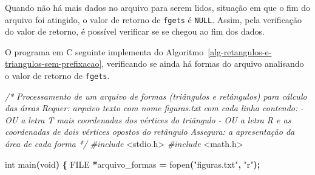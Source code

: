 \documentclass[
  11pt,
  a4paper,
]{scrbook}
\newenvironment{Shaded}{\begin{snugshade}}{\end{snugshade}}
\newcommand{\CommentTok}[1]{\textcolor[rgb]{0.56,0.35,0.01}{\textit{#1}}}
\newcommand{\DataTypeTok}[1]{\textcolor[rgb]{0.13,0.29,0.53}{#1}}
\newcommand{\ImportTok}[1]{#1}
\newcommand{\NormalTok}[1]{#1}
\newcommand{\OperatorTok}[1]{\textcolor[rgb]{0.81,0.36,0.00}{\textbf{#1}}}
\newcommand{\PreprocessorTok}[1]{\textcolor[rgb]{0.56,0.35,0.01}{\textit{#1}}}
\newcommand{\StringTok}[1]{\textcolor[rgb]{0.31,0.60,0.02}{#1}}
\begin{document}
Quando não há mais dados no arquivo para serem lidos, situação em que o
fim do arquivo foi atingido, o valor de retorno de \texttt{fgets} é
\texttt{NULL}. Assim, pela verificação do valor de retorno, é possível
verificar se se chegou ao fim dos dados.

O programa em C seguinte implementa do
Algoritmo~\ref{alg-retangulos-e-triangulos-sem-prefixacao}, verificando
se ainda há formas do arquivo analisando o valor de retorno de
\texttt{fgets}.

\begin{Shaded}
\begin{Highlighting}[]
\CommentTok{/*}
\CommentTok{Processamento de um arquivo de formas (triângulos e retângulos) para cálculo}
\CommentTok{    das áreas}
\CommentTok{Requer: arquivo texto com nome \textquotesingle{}figuras.txt\textquotesingle{} com cada linha contendo:}
\CommentTok{        {-} OU a letra T mais coordenadas dos vértices do triângulo}
\CommentTok{        {-} OU a letra R e as coordenadas de dois vértices opostos do}
\CommentTok{            retângulo}
\CommentTok{Assegura: a apresentação da área de cada forma}
\CommentTok{*/}
\PreprocessorTok{\#include }\ImportTok{\textless{}stdio.h\textgreater{}}
\PreprocessorTok{\#include }\ImportTok{\textless{}math.h\textgreater{}}

\DataTypeTok{int}\NormalTok{ main}\OperatorTok{(}\DataTypeTok{void}\OperatorTok{)} \OperatorTok{\{}
    \DataTypeTok{FILE} \OperatorTok{*}\NormalTok{arquivo\_formas }\OperatorTok{=}\NormalTok{ fopen}\OperatorTok{(}\StringTok{"figuras.txt"}\OperatorTok{,} \StringTok{"r"}\OperatorTok{);}


\end{Highlighting}
\end{Shaded}
\end{document}
